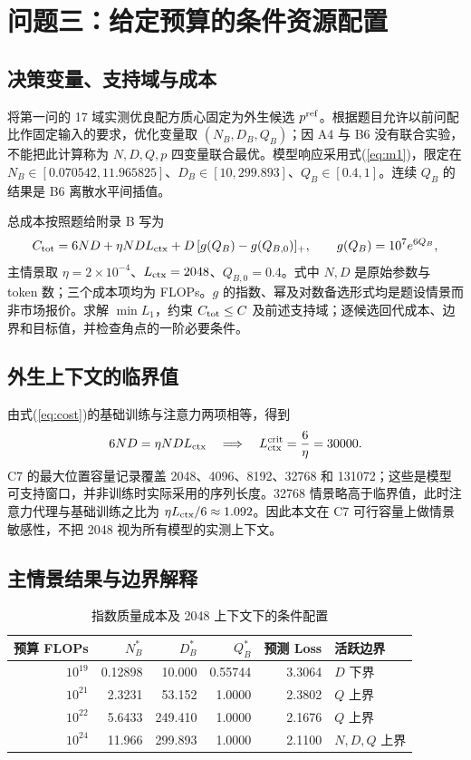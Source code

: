 \section{问题三：给定预算的条件资源配置}
\subsection{决策变量、支持域与成本}
将第一问的 17 域实测优良配方质心固定为外生候选 $p^{\rm ref}$。根据题目允许以前问配比作固定输入的要求，优化变量取 $(N_B,D_B,Q_B)$；因 A4 与 B6 没有联合实验，不能把此计算称为 $N,D,Q,p$ 四变量联合最优。模型响应采用式(\ref{eq:m1})，限定在 $N_B\in[0.070542,11.965825]$、$D_B\in[10,299.893]$、$Q_B\in[0.4,1]$。连续 $Q_B$ 的结果是 B6 离散水平间插值。

总成本按照题给附录 B 写为
\begin{equation}
C_{\rm tot}=6ND+\eta ND L_{\rm ctx}
+D\,[g(Q_B)-g(Q_{B,0})]_+,\qquad
g(Q_B)=10^7e^{6Q_B},
\label{eq:cost}
\end{equation}
主情景取 $\eta=2\times10^{-4}$、$L_{\rm ctx}=2048$、$Q_{B,0}=0.4$。式中 $N,D$ 是原始参数与 token 数；三个成本项均为 FLOPs。$g$ 的指数、幂及对数备选形式均是题设情景而非市场报价。求解 $\min L_1$，约束 $C_{\rm tot}\leq C$ 及前述支持域；逐候选回代成本、边界和目标值，并检查角点的一阶必要条件。

\subsection{外生上下文的临界值}
由式(\ref{eq:cost})的基础训练与注意力两项相等，得到
\begin{equation}
6ND=\eta NDL_{\rm ctx}\quad\Longrightarrow\quad
L_{\rm ctx}^{\rm crit}=\frac{6}{\eta}=30000.
\end{equation}
C7 的最大位置容量记录覆盖 2048、4096、8192、32768 和 131072；这些是模型可支持窗口，并非训练时实际采用的序列长度。32768 情景略高于临界值，此时注意力代理与基础训练之比为 $\eta L_{\rm ctx}/6\approx1.092$。因此本文在 C7 可行容量上做情景敏感性，不把 2048 视为所有模型的实测上下文。
\subsection{主情景结果与边界解释}
\begin{table}[htbp]\centering\caption{指数质量成本及 2048 上下文下的条件配置}
\small\begin{tabular}{rrrrrl}\toprule
预算 FLOPs & $N_B^*$ & $D_B^*$ & $Q_B^*$ & 预测 Loss & 活跃边界\\\midrule
$10^{19}$ & 0.12898 & 10.000 & 0.55744 & 3.3064 & $D$ 下界\\
$10^{21}$ & 2.3231 & 53.152 & 1.0000 & 2.3802 & $Q$ 上界\\
$10^{22}$ & 5.6433 & 249.410 & 1.0000 & 2.1676 & $Q$ 上界\\
$10^{24}$ & 11.966 & 299.893 & 1.0000 & 2.1100 & $N,D,Q$ 上界\\\bottomrule
\end{tabular}\end{table}

